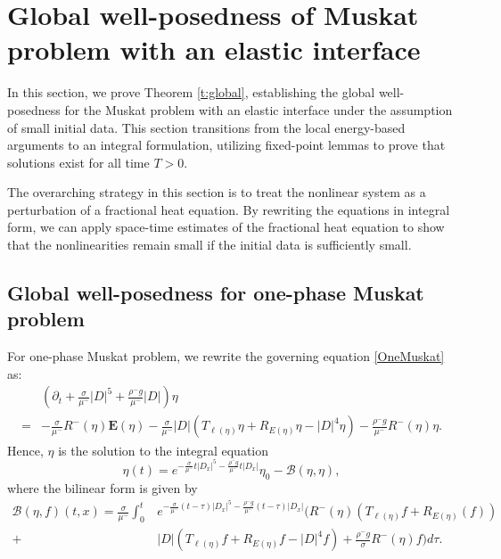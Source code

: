 \documentclass[12pt]{amsart}
\theoremstyle{definition}
\numberwithin{equation}{section}
\newcommand{\p}{\partial}
\newcommand{\f}{\frac}
\begin{document}
\section{Global well-posedness of Muskat problem with an elastic interface} \label{s:Global}
In this section, we prove Theorem \ref{t:global}, establishing the global well-posedness for the Muskat problem with an elastic interface under the assumption of small initial data.
This section transitions from the local energy-based arguments to an integral formulation, utilizing fixed-point lemmas to prove that solutions exist for all time $T>0$.

The overarching strategy in this section is to treat the nonlinear system as a perturbation of a fractional heat equation.
By rewriting the equations in integral form, we can apply space-time estimates of the fractional heat equation to show that the nonlinearities remain small if the initial data is sufficiently small.

\subsection{Global well-posedness for one-phase Muskat problem} \label{s:GlobalOneMuskat}
For one-phase Muskat problem, we rewrite the governing equation \eqref{OneMuskat} as:
\begin{equation*} 
\begin{aligned}
&\left(\p_t + \f{\sigma}{\mu^-}|D|^5 + \frac{\rho^- g}{\mu^-}|D| \right) \eta\\
=& -\f{\sigma}{\mu^-}R^-(\eta)\mathbf{E}(\eta) - \f{\sigma}{\mu^-} |D|(T_{\ell(\eta)}\eta+R_{E(\eta)}\eta - |D|^4\eta)  -\f{\rho^- g}{\mu^-} R^-(\eta) \eta.
\end{aligned}
\end{equation*}
Hence, $\eta$ is the solution to the integral equation
\begin{equation} \label{OneMuskatIntegral}
    \eta(t) = e^{- \f{\sigma}{\mu^-}t|D_x|^5 - \frac{\rho^- g}{\mu^-}t|D_x|} \eta_0 - \mathcal{B}(\eta, \eta),
\end{equation}
where the bilinear form is given by
\begin{equation*} %
\begin{aligned}
\mathcal{B}(\eta, f)(t,x) = \f{\sigma}{\mu^-}\int_0^t& e^{- \f{\sigma}{\mu^-}(t- \tau)|D_x|^5 - \frac{\rho^- g}{\mu^-}(t-\tau)|D_x|}\Big( R^-(\eta)(T_{\ell(\eta)} f + R_{E(\eta)} (f))\\
+&  |D|(T_{\ell(\eta)}f+R_{E(\eta)}f - |D|^4f)  +\f{\rho^- g}{\sigma} R^-(\eta) f \Big) d\tau.  
\end{aligned}
\end{equation*}
\end{document}

